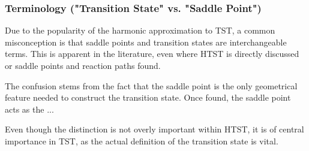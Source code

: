 \subsubsection{Terminology ("Transition State" vs. "Saddle Point")}
Due to the popularity of the harmonic approximation to TST, a common misconception is that saddle points and transition states are interchangeable terms.
This is apparent in the literature, even where HTST is directly discussed or saddle points and reaction paths found.

The confusion stems from the fact that the saddle point is the only geometrical feature needed to construct the transition state.
Once found, the saddle point acts as the ... 

Even though the distinction is not overly important within HTST, it is of central importance in TST, as the actual definition of the transition state is vital.

\incomplete
